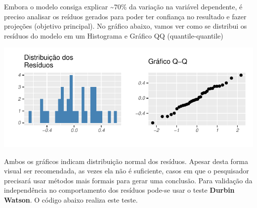 \documentclass[
  11pt,
  a4paper,
]{article}
\begin{document}
Embora o modelo consiga explicar \textasciitilde70\% da variação na variável dependente, é preciso analisar os reíduos gerados para poder ter confiança no resultado e fazer projeções (objetivo principal). No gráfico abaixo, vamos ver como se distribui os resíduos do modelo em um Histograma e Gráfico QQ (quantile-quantile)

\begin{center}\includegraphics{article_files/figure-latex/unnamed-chunk-10-1} \end{center}

Ambos os gráficos indicam distribuição normal dos resíduos. Apesar desta forma visual ser recomendada, as vezes ela não é suficiente, casos em que o pesquisador precisará usar métodos mais formais para gerar uma conclusão. Para validação da independência no comportamento dos resíduos pode-se usar o teste \textbf{Durbin Watson}. O código abaixo realiza este teste.
\end{document}
